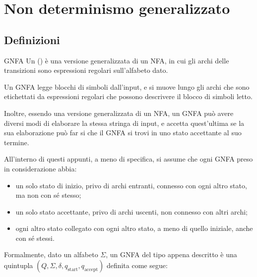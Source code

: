 \documentclass[a4paper, 12pt]{report}
\begin{document}
    \section{Non determinismo generalizzato}

    \subsection{Definizioni}
    
    \begin{frameddefn}[label={def gnfa}]{GNFA}
        Un  () è una versione generalizzata di un NFA, in cui gli archi delle transizioni sono espressioni regolari sull'alfabeto dato.

        Un GNFA legge blocchi di simboli dall'input, e si muove lungo gli archi che sono etichettati da espressioni regolari che possono descrivere il blocco di simboli letto.

        Inoltre, essendo una versione generalizzata di un NFA, un GNFA può avere diversi modi di elaborare la stessa stringa di input, e accetta quest'ultima se la sua elaborazione può far si che il GNFA si trovi in uno stato accettante al suo termine.

         All'interno di questi appunti, a meno di specifica, si assume che ogni GNFA preso in considerazione abbia:

        \begin{itemize}
            \item un solo stato di inizio, privo di archi entranti, connesso con ogni altro stato, ma non con sé stesso;
            \item un solo stato accettante, privo di archi uscenti, non connesso con altri archi;
            \item ogni altro stato collegato con ogni altro stato, a meno di quello iniziale, anche con sé stessi.
        \end{itemize}

        Formalmente, dato un alfabeto $\Sigma$, un GNFA del tipo appena descritto è una quintupla $(Q, \Sigma, \delta, q_{\mathrm{start}}, q_{\mathrm{accept}})$ definita come segue:


\end{frameddefn}
\end{document}
